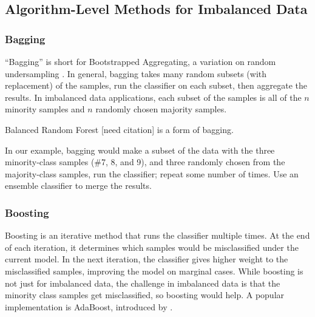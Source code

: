 \subsection{Algorithm-Level Methods for Imbalanced Data}



\subsubsection{Bagging}

``Bagging'' is short for Bootstrapped Aggregating, a variation on random undersampling \citep{BRIEMAN_1996}.  In general, bagging takes many random subsets (with replacement) of the samples, run the classifier on each subset, then aggregate the results.  In imbalanced data applications, each subset of the samples is all of the $n$ minority samples and $n$ randomly chosen majority samples.  

Balanced Random Forest [need citation] is a form of bagging.  

In our example, bagging would make a subset of the data with the three minority-class samples (\#7, 8, and 9), and three randomly chosen from the majority-class samples, run the classifier; repeat some number of times.  Use an ensemble classifier to merge the results.  

\begin{center}
\end{center}


\subsubsection{Boosting}

Boosting is an iterative method that runs the classifier multiple times.  At the end of each iteration, it determines which samples would be misclassified under the current model.  In the next iteration, the classifier gives higher weight to the misclassified samples, improving the model on marginal cases.  While boosting is not just for imbalanced data, the challenge in imbalanced data is that the minority class samples get misclassified, so boosting would help.  A popular implementation is AdaBoost, introduced by \cite{FREUND1997119}.
